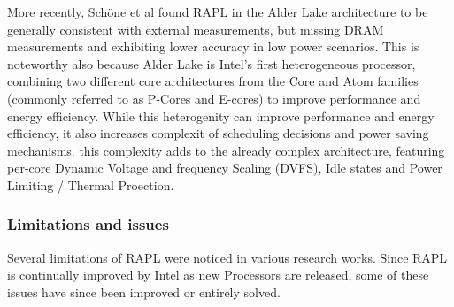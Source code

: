 More recently, Schöne et al found RAPL in the Alder Lake architecture to be generally consistent with external measurements, but missing DRAM measurements and exhibiting lower accuracy in low power scenarios\parencite{schone2024energy}. This is noteworthy also because Alder Lake is Intel's first heterogeneous processor, combining two different core architectures from the Core and Atom families (commonly referred to as P-Cores and E-cores) to improve performance and energy efficiency. While this heterogenity can improve performance and energy efficiency, it also increases complexit of scheduling decisions and power saving mechanisms. this complexity adds to the already complex architecture, featuring per-core Dynamic Voltage and frequency Scaling (DVFS), Idle states and Power Limiting / Thermal Proection.


\subsubsection{Limitations and issues}
Several limitations of RAPL were noticed in various research works. Since RAPL is continually improved by Intel as new Processors are released, some of these issues have since been improved or entirely solved. 

